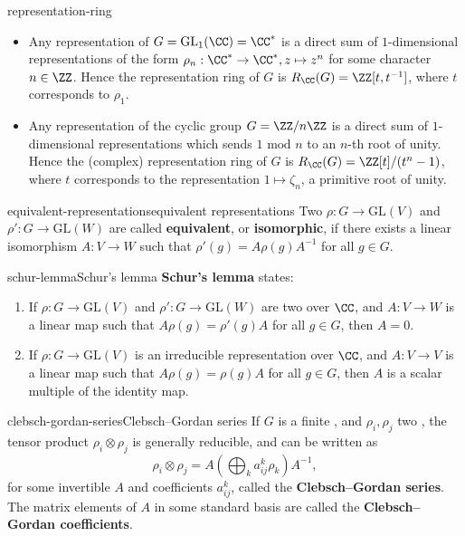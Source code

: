 \begin{example}{representation-ring}
    \begin{itemize}
        \item Any representation of $G = \text{GL}_1(\CC) = \CC^*$ is a direct sum of $1$-dimensional representations of the form $\rho_n : \CC^* \to \CC^*, z \mapsto z^n$ for some character $n \in \ZZ$. Hence the representation ring of $G$ is $R_\CC(G) = \ZZ[t, t^{-1}]$, where $t$ corresponds to $\rho_1$.
        
        \item Any representation of the cyclic group $G = \ZZ/n\ZZ$ is a direct sum of $1$-dimensional representations which sends $1 \text{ mod } n$ to an $n$-th root of unity. Hence the (complex) representation ring of $G$ is $R_\CC(G) = \ZZ[t]/(t^n - 1)$, where $t$ corresponds to the representation $1 \mapsto \zeta_n$, a primitive root of unity.
    \end{itemize}
\end{example}

\begin{topic}{equivalent-representations}{equivalent representations}
    Two  $\rho : G \to \text{GL}(V)$ and $\rho' : G \to \text{GL}(W)$ are called \textbf{equivalent}, or \textbf{isomorphic}, if there exists a linear isomorphism $A : V \to W$ such that $\rho'(g) = A \rho(g) A^{-1}$ for all $g \in G$.
\end{topic}

\begin{topic}{schur-lemma}{Schur's lemma}
    \textbf{Schur's lemma} states:
    \begin{enumerate}
        \item If $\rho : G \to \text{GL}(V)$ and $\rho' : G \to \text{GL}(W)$ are two    over $\CC$, and $A : V \to W$ is a linear map such that $A \rho(g) = \rho'(g) A$ for all $g \in G$, then $A = 0$.
        \item If $\rho : G \to \text{GL}(V)$ is an irreducible representation over $\CC$, and $A : V \to V$ is a linear map such that $A \rho(g) = \rho(g) A$ for all $g \in G$, then $A$ is a scalar multiple of the identity map.
    \end{enumerate}
\end{topic}

\begin{topic}{clebsch-gordan-series}{Clebsch--Gordan series}
    If $G$ is a finite , and $\rho_i, \rho_j$ two  , the tensor product $\rho_i \otimes \rho_j$ is generally reducible, and can be written as
    \[ \rho_i \otimes \rho_j = A \left( \bigoplus_k a^k_{ij} \rho_k \right) A^{-1} , \]
    for some invertible $A$ and coefficients $a^k_{ij}$, called the \textbf{Clebsch--Gordan series}. The matrix elements of $A$ in some standard basis are called the \textbf{Clebsch--Gordan coefficients}.
\end{topic}

